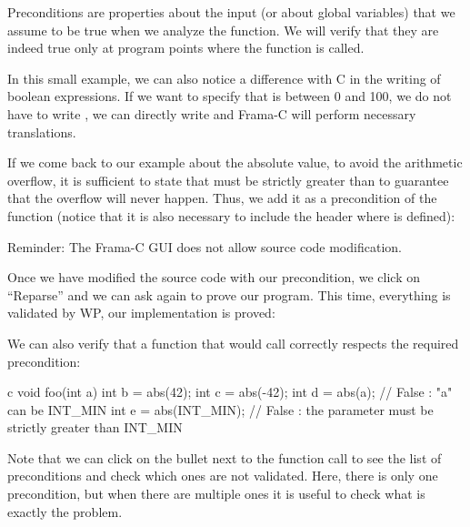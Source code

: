 Preconditions are properties about the input (or about
global variables) that we assume to be true when we analyze the
function. We will verify that they are indeed true only at program
points where the function is called.



In this small example, we can also notice a difference with C in the
writing of boolean expressions. If we want to specify that  is
between 0 and 100, we do not have to write ,
we can directly write  and Frama-C will
perform necessary translations.



If we come back to our example about the absolute value, to avoid the
arithmetic overflow, it is sufficient to state that  must
be strictly greater than  to guarantee that the
overflow will never happen. Thus, we add it as a precondition of the
function (notice that it is also necessary to include the header where
 is defined):






\begin{Warning}
  Reminder: The Frama-C GUI does not allow source code modification.
\end{Warning}


Once we have modified the source code with our precondition, we click on
``Reparse'' and we can ask again to prove our program. This time,
everything is validated by WP, our implementation is proved:





We can also verify that a function that would call 
correctly respects the required precondition:



\begin{CodeBlock}{c}
void foo(int a){
   int b = abs(42);
   int c = abs(-42);
   int d = abs(a);       // False : "a" can be INT_MIN
   int e = abs(INT_MIN); // False : the parameter must be strictly greater than INT_MIN
}
\end{CodeBlock}




Note that we can click on the bullet next to the function call to see the
list of preconditions and check which ones are not validated. Here, there is
only one precondition, but when there are multiple ones it is useful to check
what is exactly the problem.

